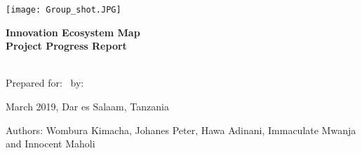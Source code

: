 \documentclass[a4paper,12pt,twoside]{article}
\begin{document}
\thispagestyle{empty}

\begin{center}
\texttt{[image: Group\_shot.JPG]}
\end{center}

\begin{center}
\bigskip
  \Huge 
\color{OMDTZblue} \textbf {Innovation Ecosystem Map}
\\
\textbf{Project Progress Report}
\\
\end{center}
\bigskip \bigskip \bigskip
\\
  \vbox{
  \centering
  Prepared for:
  \
  by:
}
\bigskip  \bigskip \bigskip
\begin{center}
  March 2019, Dar es Salaam, Tanzania  
  
 \bigskip \bigskip \bigskip \bigskip \bigskip \bigskip
 
\footnotesize {Authors: Wombura Kimacha, Johanes Peter, Hawa Adinani, Immaculate Mwanja and Innocent Maholi}
  
\end{center}

\newpage
\tableofcontents
\end{document}
